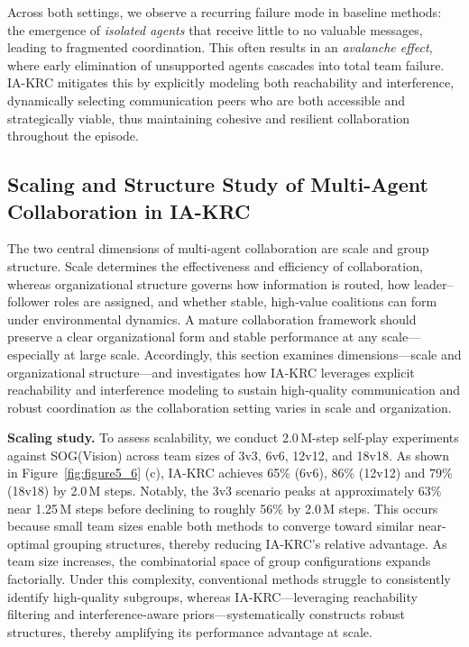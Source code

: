 \documentclass[10pt]{article} %
\begin{document}
Across both settings, we observe a recurring failure mode in baseline methods: the emergence of \textit{isolated agents} that receive little to no valuable messages, leading to fragmented coordination. This often results in an \textit{avalanche effect}, where early elimination of unsupported agents cascades into total team failure. IA-KRC mitigates this by explicitly modeling both reachability and interference, dynamically selecting communication peers who are both accessible and strategically viable, thus maintaining cohesive and resilient collaboration throughout the episode.


\subsection{Scaling and Structure Study of Multi-Agent Collaboration in IA-KRC}

The two central dimensions of multi-agent collaboration are scale and group structure. Scale determines the effectiveness and efficiency of collaboration, whereas organizational structure governs how information is routed, how leader–follower roles are assigned, and whether stable, high‑value coalitions can form under environmental dynamics. A mature collaboration framework should preserve a clear organizational form and stable performance at any scale—especially at large scale. Accordingly, this section examines dimensions—scale and organizational structure—and investigates how IA‑KRC leverages explicit reachability and interference modeling to sustain high‑quality communication and robust coordination as the collaboration setting varies in scale and organization.

\textbf{Scaling study.} To assess scalability, we conduct 2.0\,M-step self-play experiments against SOG(Vision) across team sizes of 3v3, 6v6, 12v12, and 18v18. As shown in Figure~\ref{fig:figure5_6} (c), IA-KRC achieves 65\% (6v6), 86\% (12v12) and 79\% (18v18) by 2.0\,M steps. Notably, the 3v3 scenario peaks at approximately 63\% near 1.25\,M steps before declining to roughly 56\% by 2.0\,M steps. This occurs because small team sizes enable both methods to converge toward similar near-optimal grouping structures, thereby reducing IA-KRC's relative advantage. As team size increases, the combinatorial space of group configurations expands factorially. Under this complexity, conventional methods struggle to consistently identify high-quality subgroups, whereas IA-KRC—leveraging reachability filtering and interference-aware priors—systematically constructs robust structures, thereby amplifying its performance advantage at scale.
\end{document}

